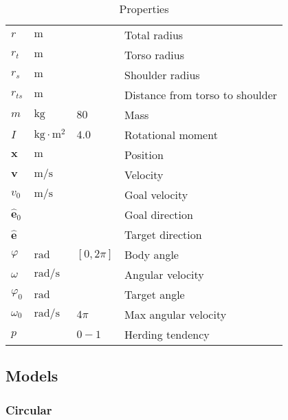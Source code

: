 \begin{table}[H]
\begin{tabularx}{1.0\linewidth}{ l l l l }
\hline
\hline
$ r $                    & $ \mathrm{m} $ &  & Total radius \\
$ r_{t} $                & $ \mathrm{m} $ &  & Torso radius \\
$ r_{s} $                & $ \mathrm{m} $ &  & Shoulder radius \\
$ r_{ts} $                & $ \mathrm{m} $ &  & Distance from torso to shoulder \\
$ m $                    & $ \mathrm{kg} $ & $ 80 $ & Mass \\
$ I $                    & $ \mathrm{kg \cdot m^{2}} $ & $ 4.0 $ & Rotational moment \\
\hline
\hline
$ \mathbf{x} $           & $ \mathrm{m} $ &  & Position \\
$ \mathbf{v} $           & $ \mathrm{m} / \mathrm{s} $ &  & Velocity \\
$ v_{0} $                & $ \mathrm{m} / \mathrm{s} $ &  & Goal velocity \\  
$ \hat{\mathbf{e}}_{0} $ &  &  & Goal direction \\
$ \hat{\mathbf{e}} $     &  &  & Target direction \\
\hline
\hline
$ \varphi $              & $ \mathrm{rad} $ & $ [0, 2 \pi] $ & Body angle \\
$ \omega $               & $ \mathrm{rad} / \mathrm{s} $ &  & Angular velocity \\
$ \varphi_{0} $          & $ \mathrm{rad} $ &  & Target angle \\
$ \omega_{0} $           & $ \mathrm{rad} / \mathrm{s} $ & $ 4\pi $ & Max angular velocity \\
\hline
\hline
$ p $                    &  & $ 0 - 1 $ & Herding tendency \\
\hline
\hline
\end{tabularx}
\caption{Properties}
\end{table}


\subsection{Models}
\subsubsection{Circular}

